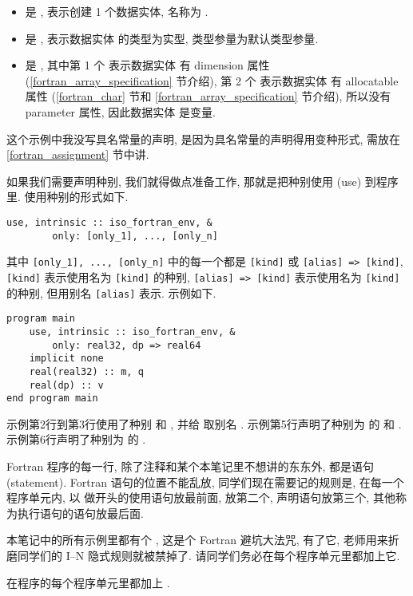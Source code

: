 \begin{itemize}
    \item {} 是 , 表示创建 1 个数据实体, 名称为 .
    \item {} 是 , 表示数据实体  的类型为实型, 类型参量为默认类型参量.
    \item {} 是 , 其中第 1 个  表示数据实体  有 dimension 属性 (\ref{fortran_array_specification} 节介绍), 第 2 个  表示数据实体  有 allocatable 属性 (\ref{fortran_char} 节和 \ref{fortran_array_specification} 节介绍), 所以没有 parameter 属性, 因此数据实体  是变量.
\end{itemize}
这个示例中我没写具名常量的声明, 是因为具名常量的声明得用变种形式, 需放在 \ref{fortran_assignment} 节中讲.

如果我们需要声明种别, 我们就得做点准备工作, 那就是把种别使用 (use) 到程序里. 使用种别的形式如下.
\begin{lstlisting}[numbers=none]
    use, intrinsic :: iso_fortran_env, &
        only: [only_1], ..., [only_n]
\end{lstlisting}
其中 \texttt{[only\_{}1], ..., [only\_{}n]} 中的每一个都是 \texttt{[kind]} 或 \texttt{[alias] => [kind]}, \texttt{[kind]} 表示使用名为 \texttt{[kind]} 的种别, \texttt{[alias] => [kind]} 表示使用名为 \texttt{[kind]} 的种别, 但用别名 \texttt{[alias]} 表示. 示例如下.
\begin{lstlisting}
program main
    use, intrinsic :: iso_fortran_env, &
        only: real32, dp => real64
    implicit none
    real(real32) :: m, q
    real(dp) :: v
end program main
\end{lstlisting}
示例第2行到第3行使用了种别  和 , 并给  取别名 . 示例第5行声明了种别为  的  和 . 示例第6行声明了种别为  的 .

Fortran 程序的每一行, 除了注释和某个本笔记里不想讲的东东外, 都是语句 (statement). Fortran 语句的位置不能乱放, 同学们现在需要记的规则是, 在每一个程序单元内, 以  做开头的使用语句放最前面,  放第二个, 声明语句放第三个, 其他称为执行语句的语句放最后面.

本笔记中的所有示例里都有个 , 这是个 Fortran 避坑大法咒, 有了它, 老师用来折磨同学们的 I--N 隐式规则就被禁掉了. 请同学们务必在每个程序单元里都加上它.
\begin{convention}
    在程序的每个程序单元里都加上 .
\end{convention}

